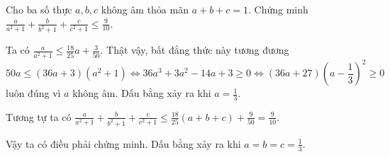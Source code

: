 \begin{problem}
    Cho ba số thực $a, b, c$ không âm thỏa mãn $a + b + c = 1$. Chứng minh $\displaystyle \frac{a}{a^2 + 1} + \frac{b}{b^2 + 1} + \frac{c}{c^2 + 1} \le \frac{9}{10}$.
    \solution
    
    Ta có $\displaystyle \frac{a}{a^2 + 1} \le \frac{18}{25}a + \frac{3}{50}$. Thật vậy, bất đẳng thức này tương đương 
    $$
        50a \le (36a + 3)(a^2 + 1) \Leftrightarrow 36a^3 + 3a^2 - 14a + 3 \ge 0 \Leftrightarrow (36a + 27)\left(a - \frac{1}{3}\right)^2 \ge 0
    $$
    luôn đúng vì $a$ không âm. Dấu bằng xảy ra khi $a = \frac{1}{3}$.
    
    Tương tự ta có $\displaystyle \frac{a}{a^2 + 1} + \frac{b}{b^2 + 1} + \frac{c}{c^2 + 1} \le \frac{18}{25}(a + b + c) + \frac{9}{50} = \frac{9}{10}$.
    
    Vậy ta có điều phải chứng minh. Dấu bằng xảy ra khi $\displaystyle a = b = c = \frac{1}{3}$.
\end{problem}